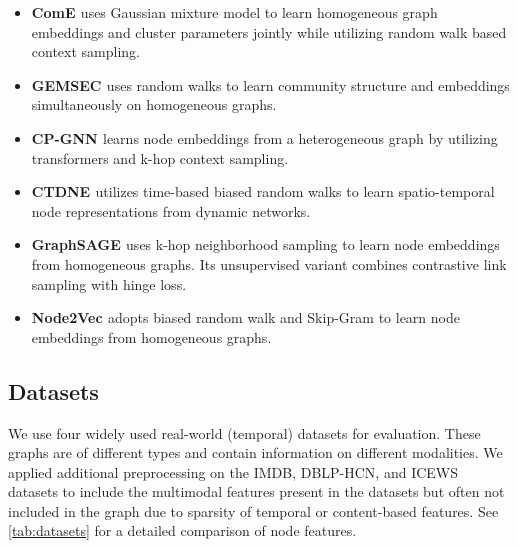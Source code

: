 \begin{itemize}[leftmargin=*]
    \item \textbf{ComE \cite{cavallariLearningCommunityEmbedding2017}} uses Gaussian mixture model to learn homogeneous graph embeddings and cluster parameters jointly while utilizing random walk based context sampling.
    \item \textbf{GEMSEC \cite{rozemberczkiGEMSECGraphEmbedding2019}} uses random walks to learn community structure and embeddings simultaneously on homogeneous graphs.
    \item \textbf{CP-GNN \cite{luoDetectingCommunitiesHeterogeneous2021} } learns node embeddings from a heterogeneous graph by utilizing transformers and k-hop context sampling.
    \item \textbf{CTDNE \cite{nguyenContinuousTimeDynamicNetwork2018} } utilizes time-based biased random walks to learn spatio-temporal node representations from dynamic networks. 
    \item \textbf{GraphSAGE \cite{hamiltonInductiveRepresentationLearning2017} } uses k-hop neighborhood sampling to learn node embeddings from homogeneous graphs. Its unsupervised variant combines contrastive link sampling with hinge loss.  
    \item \textbf{Node2Vec \cite{groverNode2vecScalableFeature2016}} adopts biased random walk and Skip-Gram to learn node embeddings from homogeneous graphs.
\end{itemize}

\subsection{Datasets} 


We use four widely used real-world (temporal) datasets for evaluation.
These graphs are of different types and contain information on different modalities.
We applied additional preprocessing on the IMDB, DBLP-HCN, and ICEWS datasets to include the multimodal features present in the datasets but often not included in the graph due to sparsity of temporal or content-based features. 
See \cref{tab:datasets} for a detailed comparison of node features.

